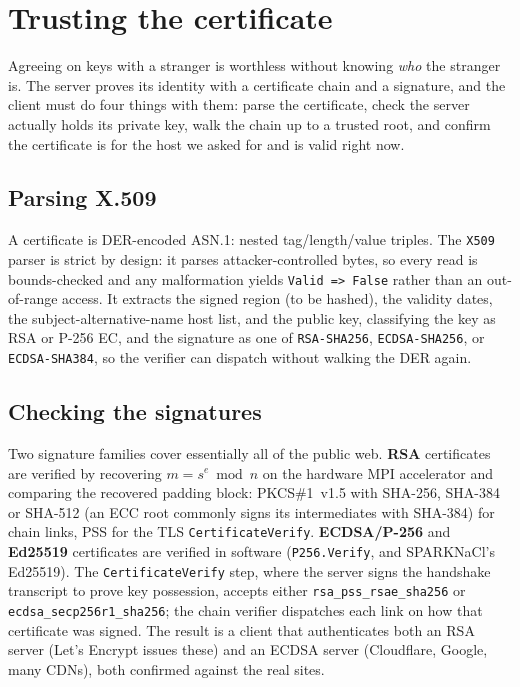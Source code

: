 \section{Trusting the certificate}
\label{ch:tls:certs}

Agreeing on keys with a stranger is worthless without knowing \emph{who} the
stranger is. The server proves its identity with a certificate chain and a
signature, and the client must do four things with them: parse the certificate,
check the server actually holds its private key, walk the chain up to a trusted
root, and confirm the certificate is for the host we asked for and is valid right
now.

\subsection{Parsing X.509}

A certificate is DER-encoded ASN.1: nested tag/length/value triples. The
\texttt{X509} parser is strict by design: it parses attacker-controlled bytes, so
every read is bounds-checked and any malformation yields \texttt{Valid => False}
rather than an out-of-range access. It extracts the signed region (to be hashed),
the validity dates, the subject-alternative-name host list, and the public key,
classifying the key as RSA or P-256 EC, and the signature as one of
\texttt{RSA-SHA256}, \texttt{ECDSA-SHA256}, or \texttt{ECDSA-SHA384}, so the
verifier can dispatch without walking the DER again.

\subsection{Checking the signatures}

Two signature families cover essentially all of the public web. \textbf{RSA}
certificates are verified by recovering $m = s^e \bmod n$ on the hardware MPI
accelerator and comparing the recovered padding block: PKCS\#1~v1.5 with
SHA-256, SHA-384 or SHA-512 (an ECC root commonly signs its intermediates with
SHA-384) for chain links, PSS for the TLS \texttt{CertificateVerify}.
\textbf{ECDSA/P-256} and \textbf{Ed25519} certificates are verified in software
(\texttt{P256.Verify}, and SPARKNaCl's Ed25519). The \texttt{CertificateVerify}
step, where the server signs the handshake transcript to prove key possession,
accepts either \texttt{rsa\_pss\_rsae\_sha256} or \texttt{ecdsa\_secp256r1\_sha256};
the chain verifier dispatches each link on how that certificate was signed. The
result is a client that authenticates both an RSA server (Let's Encrypt issues
these) and an ECDSA server (Cloudflare, Google, many CDNs), both confirmed
against the real sites.

